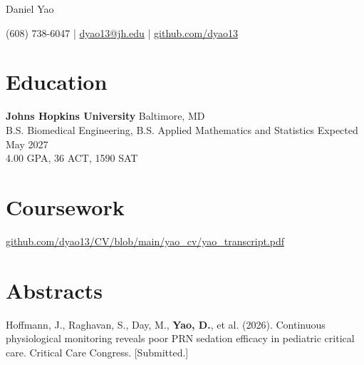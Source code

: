 \documentclass[11pt]{article}       %
\begin{document}
\centerline{\Huge Daniel Yao}

\vspace{5pt}

\centerline{(608) 738-6047 | \href{mailto:dyao13@jh.edu}{dyao13@jh.edu} | \href{https://github.com/dyao13/}{github.com/dyao13}}

\vspace{-9pt}

\section*{Education}

\textbf{Johns Hopkins University} \hfill Baltimore, MD \\
B.S. Biomedical Engineering, B.S. Applied Mathematics and Statistics \hfill Expected May 2027 \\
4.00 GPA, 36 ACT, 1590 SAT

\vspace{-9pt}

\section*{Coursework}

\href{https://github.com/dyao13/CV/blob/main/yao_cv/yao_transcript.pdf}{github.com/dyao13/CV/blob/main/yao\_cv/yao\_transcript.pdf}

\vspace{-9pt}



\section*{Abstracts}

Hoffmann, J., Raghavan, S., Day, M., \textbf{Yao, D.}, et al. (2026). Continuous physiological monitoring reveals poor PRN sedation efficacy in pediatric critical care. Critical Care Congress. [Submitted.] \\
\end{document}
